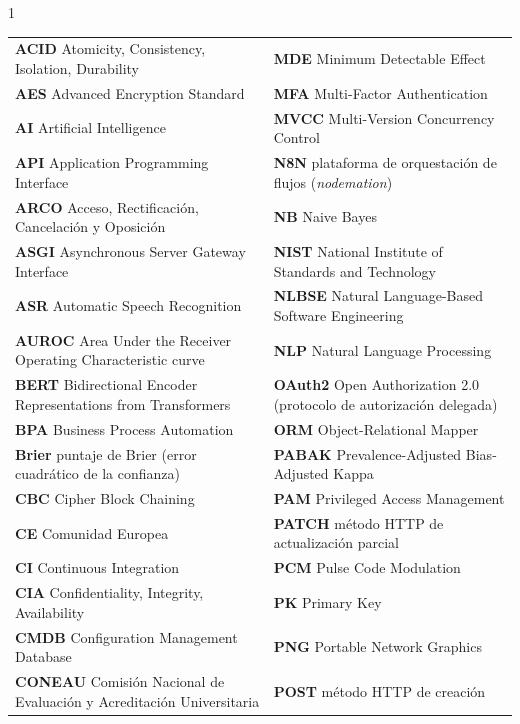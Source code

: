 \begin{spacing}{1}
\footnotesize
\setlength{\tabcolsep}{3pt}
\noindent\begin{tabular}{@{}>{\raggedright\arraybackslash}p{}@{\hspace{0.05\textwidth}}>{\raggedright\arraybackslash}p{}@{}}
\textbf{ACID} Atomicity, Consistency, Isolation, Durability & \textbf{MDE} Minimum Detectable Effect \\
\textbf{AES} Advanced Encryption Standard & \textbf{MFA} Multi-Factor Authentication \\
\textbf{AI} Artificial Intelligence & \textbf{MVCC} Multi-Version Concurrency Control \\
\textbf{API} Application Programming Interface & \textbf{N8N} plataforma de orquestación de flujos (\emph{nodemation}) \\
\textbf{ARCO} Acceso, Rectificación, Cancelación y Oposición & \textbf{NB} Naive Bayes \\
\textbf{ASGI} Asynchronous Server Gateway Interface & \textbf{NIST} National Institute of Standards and Technology \\
\textbf{ASR} Automatic Speech Recognition & \textbf{NLBSE} Natural Language-Based Software Engineering \\
\textbf{AUROC} Area Under the Receiver Operating Characteristic curve & \textbf{NLP} Natural Language Processing \\
\textbf{BERT} Bidirectional Encoder Representations from Transformers & \textbf{OAuth2} Open Authorization 2.0 (protocolo de autorización delegada) \\
\textbf{BPA} Business Process Automation & \textbf{ORM} Object-Relational Mapper \\
\textbf{Brier} puntaje de Brier (error cuadrático de la confianza) & \textbf{PABAK} Prevalence-Adjusted Bias-Adjusted Kappa \\
\textbf{CBC} Cipher Block Chaining & \textbf{PAM} Privileged Access Management \\
\textbf{CE} Comunidad Europea & \textbf{PATCH} método HTTP de actualización parcial \\
\textbf{CI} Continuous Integration & \textbf{PCM} Pulse Code Modulation \\
\textbf{CIA} Confidentiality, Integrity, Availability & \textbf{PK} Primary Key \\
\textbf{CMDB} Configuration Management Database & \textbf{PNG} Portable Network Graphics \\
\textbf{CONEAU} Comisión Nacional de Evaluación y Acreditación Universitaria & \textbf{POST} método HTTP de creación \\

\end{tabular}
\end{spacing}
